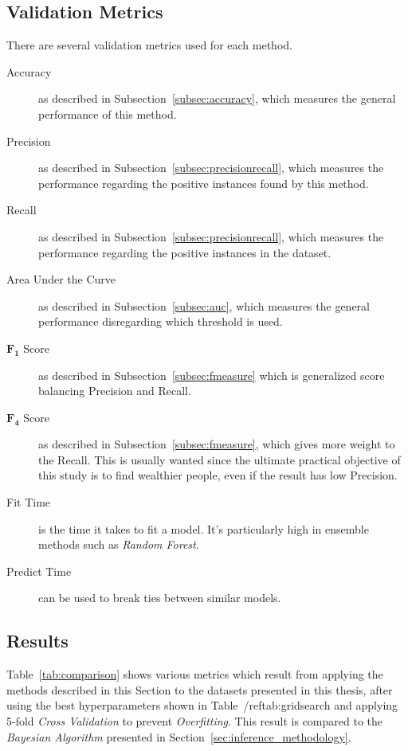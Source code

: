\subsection{Validation Metrics}
\label{subsec:validationmetrics}
There are several validation metrics used for each method.

\begin{description}
	\item[Accuracy] as described in Subsection~\ref{subsec:accuracy}, which measures the general performance of this method.
	\item[Precision] as described in Subsection~\ref{subsec:precisionrecall}, which measures the performance regarding the positive instances found by this method.
	\item[Recall] as described in Subsection~\ref{subsec:precisionrecall}, which measures the performance regarding the positive instances in the dataset.
	\item[Area Under the Curve] as described in Subsection~\ref{subsec:auc}, which measures the general performance disregarding which threshold is used.
	\item[$\mathbf{F_1}$ Score] as described in Subsection~\ref{subsec:fmeasure} which is generalized score balancing Precision and Recall.
	\item[$\mathbf{F_4}$ Score] as described in Subsection~\ref{subsec:fmeasure}, which gives more weight to the Recall. This is usually wanted since the ultimate practical objective of this study is to find wealthier people, even if the result has low Precision.
	\item[Fit Time] is the time it takes to fit a model. It's particularly high in ensemble methods such as \emph{Random Forest}.
	\item[Predict Time] can be used to break ties between similar models.
\end{description}

\subsection{Results}

Table~\ref{tab:comparison} shows various metrics which result from applying the methods described in this Section to the datasets presented in this thesis, after using the best hyperparameters shown in Table~/ref{tab:gridsearch} and applying 5-fold \emph{Cross Validation} to prevent \emph{Overfitting}. This result is compared to the \emph{Bayesian Algorithm} presented in Section~\ref{sec:inference_methodology}.

